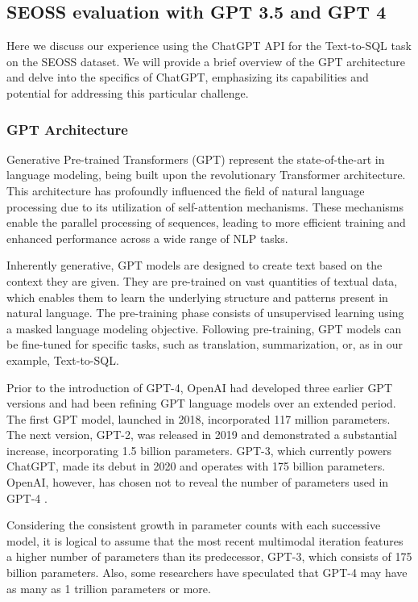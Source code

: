 \subsection{SEOSS evaluation with GPT 3.5 and GPT 4}

Here we discuss our experience using the ChatGPT API for the Text-to-SQL task on the SEOSS dataset. We will provide a brief overview of the \ac{GPT} architecture and delve into the specifics of ChatGPT, emphasizing its capabilities and potential for addressing this particular challenge.
\subsubsection{GPT Architecture}

Generative Pre-trained Transformers (GPT) \cite{radford2018improving} represent the state-of-the-art in language modeling, being built upon the revolutionary Transformer architecture. This architecture has profoundly influenced the field of natural language processing due to its utilization of self-attention mechanisms. These mechanisms enable the parallel processing of sequences, leading to more efficient training and enhanced performance across a wide range of NLP tasks.

Inherently generative, GPT models are designed to create text based on the context they are given. They are pre-trained on vast quantities of textual data, which enables them to learn the underlying structure and patterns present in natural language. The pre-training phase consists of unsupervised learning using a masked language modeling objective. Following pre-training, GPT models can be fine-tuned for specific tasks, such as translation, summarization, or, as in our example, Text-to-SQL.

Prior to the introduction of GPT-4, OpenAI had developed three earlier GPT versions and had been refining GPT language models over an extended period. The first GPT model, launched in 2018, incorporated 117 million parameters. The next version, GPT-2, was released in 2019 and demonstrated a substantial increase, incorporating 1.5 billion parameters. GPT-3, which currently powers ChatGPT, made its debut in 2020 and operates with 175 billion parameters. OpenAI, however, has chosen not to reveal the number of parameters used in GPT-4 \cite{openai2023gpt4}.

Considering the consistent growth in parameter counts with each successive model, it is logical to assume that the most recent multimodal iteration features a higher number of parameters than its predecessor, GPT-3, which consists of 175 billion parameters. Also, some researchers have speculated that GPT-4 may have as many as 1 trillion parameters or more\cite{bubeck2023sparks}.

